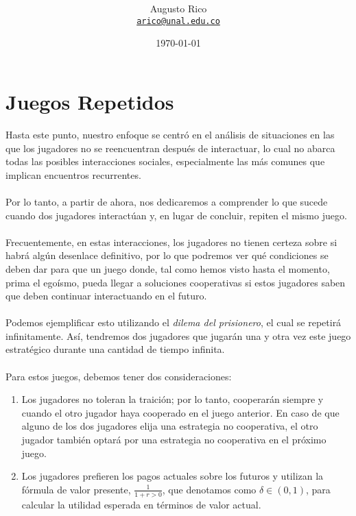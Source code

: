 \documentclass[11pt]{article}
\title{\text{Microeconomia III - $4^a$ Monitoria}
}
\author{Augusto Rico\\%
    \href{mailto:arico@unal.edu.co}{\texttt{arico@unal.edu.co}}
    }
\date{\today}
\begin{document}
\maketitle


\section{Juegos Repetidos}

\begin{flushleft}
    Hasta este punto, nuestro enfoque se centró en el análisis de situaciones en las que los jugadores no se reencuentran después de interactuar, lo cual no abarca todas las posibles interacciones sociales, especialmente las más comunes que implican encuentros recurrentes.\\~\\

    Por lo tanto, a partir de ahora, nos dedicaremos a comprender lo que sucede cuando dos jugadores interactúan y, en lugar de concluir, repiten el mismo juego.\\~\\
    
    Frecuentemente, en estas interacciones, los jugadores no tienen certeza sobre si habrá algún desenlace definitivo, por lo que podremos ver qué condiciones se deben dar para que un juego donde, tal como hemos visto hasta el momento, prima el egoísmo, pueda llegar a soluciones cooperativas si estos jugadores saben que deben continuar interactuando en el futuro.\\~\\

    Podemos ejemplificar esto utilizando el \textit{dilema del prisionero}, el cual se repetirá infinitamente. Así, tendremos dos jugadores que jugarán una y otra vez este juego estratégico durante una cantidad de tiempo infinita.\\~\\

    Para estos juegos, debemos tener dos consideraciones:
    
    \begin{enumerate}
        \item Los jugadores no toleran la traición; por lo tanto, cooperarán siempre y cuando el otro jugador haya cooperado en el juego anterior. En caso de que alguno de los dos jugadores elija una estrategia no cooperativa, el otro jugador también optará por una estrategia no cooperativa en el próximo juego.
        \item Los jugadores prefieren los pagos actuales sobre los futuros y utilizan la fórmula de valor presente, $\frac{1}{1+r>0}$, que denotamos como $\delta\in(0,1)$, para calcular la utilidad esperada en términos de valor actual.
    \end{enumerate}


\end{flushleft}
\end{document}

